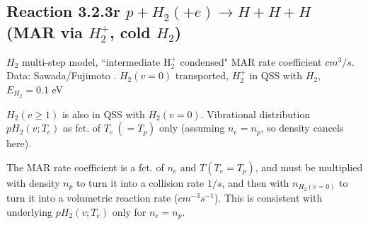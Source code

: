 \documentclass[12pt,dvipdfmx]{article}
\begin{document}
\subsection{
Reaction 3.2.3r   $p + H_2 (+e)   \rightarrow H + H + H  $ (MAR via $H_2^+$, cold $H_2$)
}

$H_2$ multi-step model, ``intermediate H$_2^+$ condensed" MAR rate coefficient $cm^3/s$.
Data: Sawada/Fujimoto \cite{kn:Sawada}.
$H_2(v=0)$ transported, $H_2^+$ in QSS with $H_2$, $E_{H_2}=0.1$ eV

$H_2(v\geq 1)$ is also in QSS with $H_2(v=0)$. Vibrational distribution $pH_2(v;T_e)$ as fct. of $T_e~(=T_p)$ only (assuming $n_e=n_p$, so density cancels here).

The MAR rate coefficient is a fct. of $n_e$ and $T (T_e=T_p)$, and must be multiplied with density $n_p$ to turn it into a collision rate $1/s$,
and then with $n_{H_2(v=0)}$ to turn it into a volumetric reaction rate ($cm^{-3}s^{-1}$). This is consistent with underlying $pH_2(v;T_e)$ only
for $n_e=n_p$.
\end{document}
